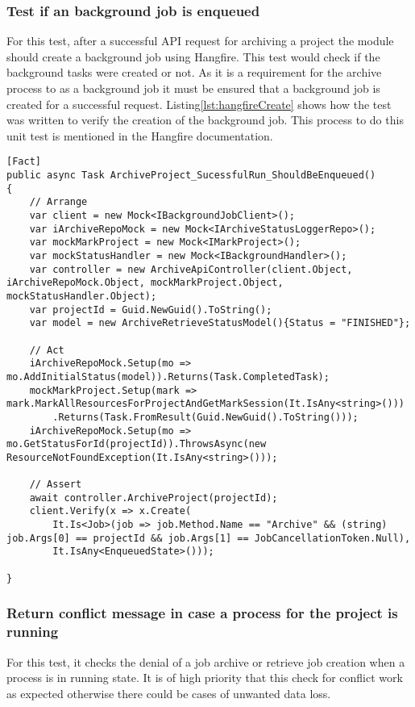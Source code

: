 \subsubsection{Test if an background job is enqueued}
For this test, after a successful API request for archiving a project the module should create a background job using Hangfire. This test would check if the
background tasks were created or not. As it is a requirement for the archive process to as a background job it must be ensured that a background job is created 
for a successful request. Listing\ref{lst:hangfireCreate} shows how the test was written to verify the creation of the background job. This process to do this unit
test is mentioned in the Hangfire documentation.

\begin{lstlisting}[language={[Sharp]C}, caption={Hangfire Job creation test}, captionpos=b,label={lst:hangfireCreate}]
[Fact]
public async Task ArchiveProject_SucessfulRun_ShouldBeEnqueued()
{
    // Arrange
    var client = new Mock<IBackgroundJobClient>();
    var iArchiveRepoMock = new Mock<IArchiveStatusLoggerRepo>();
    var mockMarkProject = new Mock<IMarkProject>();
    var mockStatusHandler = new Mock<IBackgroundHandler>();
    var controller = new ArchiveApiController(client.Object, iArchiveRepoMock.Object, mockMarkProject.Object, mockStatusHandler.Object);
    var projectId = Guid.NewGuid().ToString();
    var model = new ArchiveRetrieveStatusModel(){Status = "FINISHED"}; 
    
    // Act
    iArchiveRepoMock.Setup(mo => mo.AddInitialStatus(model)).Returns(Task.CompletedTask);
    mockMarkProject.Setup(mark => mark.MarkAllResourcesForProjectAndGetMarkSession(It.IsAny<string>()))
        .Returns(Task.FromResult(Guid.NewGuid().ToString()));
    iArchiveRepoMock.Setup(mo => mo.GetStatusForId(projectId)).ThrowsAsync(new ResourceNotFoundException(It.IsAny<string>()));

    // Assert
    await controller.ArchiveProject(projectId);
    client.Verify(x => x.Create(
        It.Is<Job>(job => job.Method.Name == "Archive" && (string) job.Args[0] == projectId && job.Args[1] == JobCancellationToken.Null),
        It.IsAny<EnqueuedState>()));

}
\end{lstlisting}

\subsubsection{Return conflict message in case a process for the project is running}
For this test, it checks the denial of a job archive or retrieve job creation when a process is in running state. It is of high priority that this check
for conflict work as expected otherwise there could be cases of unwanted data loss. 

